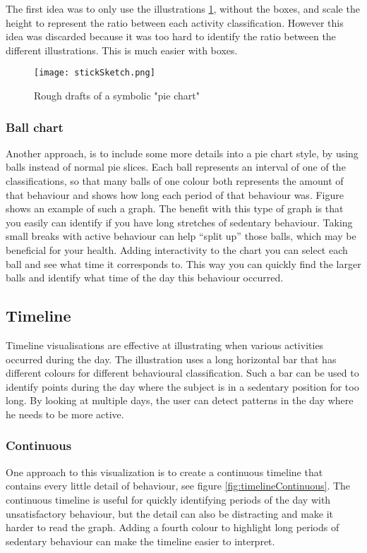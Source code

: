 The first idea was to only use the illustrations \ref{fig:symbolicPie}, without the boxes, and scale the height to represent the ratio between each activity classification. However this idea was discarded because it was too hard to identify the ratio between the different illustrations. This is much easier with boxes.

\begin{figure}[h!]
	\centering
		\texttt{[image: stickSketch.png]}
		\caption{\footnotesize Rough drafts of a symbolic "pie chart"}
		\label{fig:symbolicPie}
\end{figure}

\subsubsection{Ball chart}
Another approach, is to include some more details into a pie chart style, by using balls instead of normal pie slices. Each ball represents an interval of one of the classifications, so that many balls of one colour both represents the amount of that behaviour and shows how long each period of that behaviour was. Figure %
shows an example of such a graph. The benefit with this type of graph is that you easily can identify if you have long stretches of sedentary behaviour. Taking small breaks with active behaviour can help ``split up'' those balls, which may be beneficial for your health. Adding interactivity to the chart you can select each ball and see what time it corresponds to. This way you can quickly find the larger balls and identify what time of the day this behaviour occurred. 

\subsection{Timeline}
Timeline visualisations are effective at illustrating when various activities occurred during the day. The illustration uses a long horizontal bar that has different colours for different behavioural classification. Such a bar can be used to identify points during the day where the subject is in a sedentary position for too long. By looking at multiple days, the user can detect patterns in the day where he needs to be more active.

\subsubsection{Continuous}
One approach to this visualization is to create a continuous timeline that contains every little detail of behaviour, see figure \ref{fig:timelineContinuous}. The continuous timeline is useful for quickly identifying periods of the day with unsatisfactory behaviour, but the detail can also be distracting and make it harder to read the graph. Adding a fourth colour to highlight long periods of sedentary behaviour can make the timeline easier to interpret.

